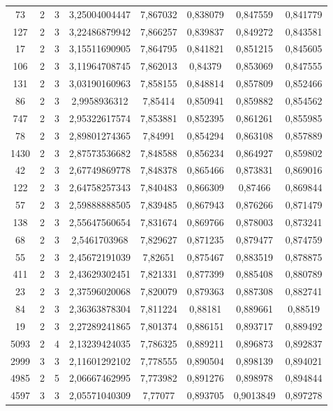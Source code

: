 \begin{longtable}{|c|c|c|c|c|c|c|c|}
73 & 2 & 3 & 3,25004004447 & 7,867032 & 0,838079 & 0,847559 & 0,841779 \\
127 & 2 & 3 & 3,22486879942 & 7,866257 & 0,839837 & 0,849272 & 0,843581 \\
17 & 2 & 3 & 3,15511690905 & 7,864795 & 0,841821 & 0,851215 & 0,845605 \\
106 & 2 & 3 & 3,11964708745 & 7,862013 & 0,84379 & 0,853069 & 0,847555 \\
131 & 2 & 3 & 3,03190160963 & 7,858155 & 0,848814 & 0,857809 & 0,852466 \\
86 & 2 & 3 & 2,9958936312 & 7,85414 & 0,850941 & 0,859882 & 0,854562 \\
747 & 2 & 3 & 2,95322617574 & 7,853881 & 0,852395 & 0,861261 & 0,855985 \\
78 & 2 & 3 & 2,89801274365 & 7,84991 & 0,854294 & 0,863108 & 0,857889 \\
1430 & 2 & 3 & 2,87573536682 & 7,848588 & 0,856234 & 0,864927 & 0,859802 \\
42 & 2 & 3 & 2,67749869778 & 7,848378 & 0,865466 & 0,873831 & 0,869016 \\
122 & 2 & 3 & 2,64758257343 & 7,840483 & 0,866309 & 0,87466 & 0,869844 \\
57 & 2 & 3 & 2,59888888505 & 7,839485 & 0,867943 & 0,876266 & 0,871479 \\
138 & 2 & 3 & 2,55647560654 & 7,831674 & 0,869766 & 0,878003 & 0,873241 \\
68 & 2 & 3 & 2,5461703968 & 7,829627 & 0,871235 & 0,879477 & 0,874759 \\
55 & 2 & 3 & 2,45672191039 & 7,82651 & 0,875467 & 0,883519 & 0,878875 \\
411 & 2 & 3 & 2,43629302451 & 7,821331 & 0,877399 & 0,885408 & 0,880789 \\
23 & 2 & 3 & 2,37596020068 & 7,820079 & 0,879363 & 0,887308 & 0,882741 \\
84 & 2 & 3 & 2,36363878304 & 7,811224 & 0,88181 & 0,889661 & 0,88519 \\
19 & 2 & 3 & 2,27289241865 & 7,801374 & 0,886151 & 0,893717 & 0,889492 \\
5093 & 2 & 4 & 2,13239424035 & 7,786325 & 0,889211 & 0,896873 & 0,892837 \\
2999 & 3 & 3 & 2,11601292102 & 7,778555 & 0,890504 & 0,898139 & 0,894021 \\
4985 & 2 & 5 & 2,06667462995 & 7,773982 & 0,891276 & 0,898978 & 0,894844 \\
4597 & 3 & 3 & 2,05571040309 & 7,77077 & 0,893705 & 0,9013849 & 0,897278 \\

\end{longtable}
